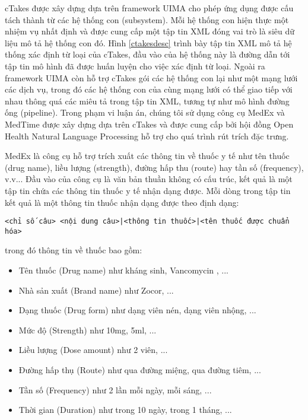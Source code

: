 cTakes được xây dựng dựa trên framework UIMA cho phép ứng dụng được cấu tách thành từ các hệ thống con (subsystem). Mỗi hệ thống con hiện thực một nhiệm vụ nhất định và được cung cấp một tập tin XML đóng vai trò là siêu dữ liệu mô tả hệ thống con đó. Hình \ref{ctakesdesc} trình bày tập tin XML mô tả hệ thống xác định từ loại của cTakes, đầu vào của hệ thống này là đường dẫn tới tập tin mô hình đã được huấn luyện cho việc xác định từ loại. Ngoài ra framework UIMA còn hỗ trợ cTakes gói các hệ thống con lại như một mạng lưới các dịch vụ, trong đó các hệ thống con của cùng mạng lưới có thể giao tiếp với nhau thông quá các miêu tả trong tập tin XML, tương tự như mô hình đường ống (pipeline). Trong phạm vi luận án, chúng tôi sử dụng công cụ MedEx \cite{HuaXu2009} và MedTime \cite{HuaXu2009} được xây dựng dựa trên cTakes và được cung cấp bởi hội đồng Open Health Natural Language Processing hỗ trợ cho quá trình rút trích đặc trưng.

MedEx là công cụ hỗ trợ trích xuất các thông tin về thuốc y tế như tên thuốc (drug name), liều lượng (strength), đường hấp thu (route) hay tần số (frequency), v.v... Đầu vào của công cụ là văn bản thuần không có cấu trúc, kết quả là một tập tin chứa các thông tin thuốc y tế nhận dạng được. Mỗi dòng trong tập tin kết quả là một thông tin thuốc nhận dạng được theo định dạng:

\begin{center}
\texttt{<chỉ số câu> <nội dung câu>|<thông tin thuốc>|<tên thuốc được chuẩn hóa>}
\end{center}

\noindent trong đó thông tin về thuốc bao gồm:

\begin{itemize}
\item Tên thuốc (Drug name) như kháng sinh, Vancomycin , ...
\item Nhà sản xuất (Brand name) như Zocor, ...
\item Dạng thuốc (Drug form) như dạng viên nén, dạng viên nhộng, ...
\item Mức độ (Strength) như 10mg, 5ml, ...
\item Liều lượng (Dose amount) như 2 viên, ...
\item Đường hấp thụ (Route) như qua đường miệng, qua đường tiêm, ...
\item Tần số (Frequency) như 2 lần mỗi ngày, mỗi sáng, ...
\item Thời gian (Duration) như trong 10 ngày, trong 1 tháng, ...
\end{itemize}


